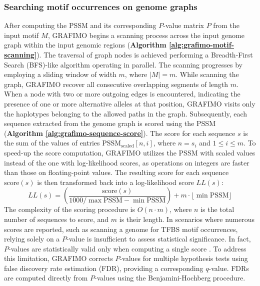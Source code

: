 \documentclass[a4paper, titlepage, openright]{book}
\newcommand{\grafimo}{GRAFIMO\xspace}
\begin{document}
\subsubsection{Searching motif occurrences on genome graphs}
After computing the PSSM and its corresponding $P$-value matrix $P$ from the input motif $M$, \grafimo begins a scanning process across the input genome graph within the input genomic regions (\textbf{Algorithm \ref{alg:grafimo-motif-scanning}}). The traversal of graph nodes is achieved performing a Breadth-First Search (BFS)-like algorithm operating in parallel. The scanning progresses by employing a sliding window of width $m$, where $|M|=m$. While scanning the graph, \grafimo recover all consecutive overlapping segments of length $m$. When a node with two or more outgoing edges is encountered, indicating the presence of one or more alternative alleles at that position, \grafimo visits only the haplotypes belonging to the allowed paths in the graph. Subsequently, each sequence extracted from the genome graph is scored using the PSSM (\textbf{Algorithm \ref{alg:grafimo-sequence-score}}). The score for each sequence $s$ is the sum of the values of entries $\text{PSSM}_{\text{scaled}}[n,i]$, where $n=s_{i}$ and $1 \leq i \leq m$. To speed-up the score computation, \grafimo utilizes the PSSM with scaled values instead of the one with log-likelihood scores, as operations on integers are faster than those on floating-point values. The resulting score for each sequence $\text{score}(s)$ is then transformed back into a log-likelihood score $LL(s)$:
\[
    LL(s) = \left ( \frac{\text{score}(s)}{1000 / \max{\text{PSSM}} - \min{\text{PSSM}}} \right ) + m \cdot \lfloor \min{\text{PSSM}} \rfloor
\]
The complexity of the scoring procedure is $O(n \cdot m)$, where $n$ is the total number of sequences to score, and $m$ is their length. In scenarios where numerous scores are reported, such as scanning a genome for TFBS motif occurrences, relying solely on a $P$-value is insufficient to assess statistical significance. In fact, $P$-values are statistically valid only when computing a single score \citep{noble2009does}. To address this limitation, \grafimo corrects $P$-values for multiple hypothesis tests using false discovery rate estimation (FDR), providing a corresponding $q$-value. FDRs are computed directly from $P$-values using the Benjamini-Hochberg procedure.
\end{document}
